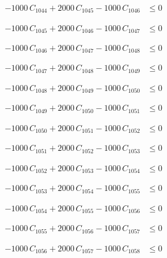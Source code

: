 \documentclass[a4paper,11pt]{article}
\begin{document}
\begin{align}
-1000\,C_{1044} + 2000\,C_{1045} - 1000\,C_{1046} &\leq 0 \nonumber
\end{align}

\begin{align}
-1000\,C_{1045} + 2000\,C_{1046} - 1000\,C_{1047} &\leq 0 \nonumber
\end{align}

\begin{align}
-1000\,C_{1046} + 2000\,C_{1047} - 1000\,C_{1048} &\leq 0 \nonumber
\end{align}

\begin{align}
-1000\,C_{1047} + 2000\,C_{1048} - 1000\,C_{1049} &\leq 0 \nonumber
\end{align}

\begin{align}
-1000\,C_{1048} + 2000\,C_{1049} - 1000\,C_{1050} &\leq 0 \nonumber
\end{align}

\begin{align}
-1000\,C_{1049} + 2000\,C_{1050} - 1000\,C_{1051} &\leq 0 \nonumber
\end{align}

\begin{align}
-1000\,C_{1050} + 2000\,C_{1051} - 1000\,C_{1052} &\leq 0 \nonumber
\end{align}

\begin{align}
-1000\,C_{1051} + 2000\,C_{1052} - 1000\,C_{1053} &\leq 0 \nonumber
\end{align}

\begin{align}
-1000\,C_{1052} + 2000\,C_{1053} - 1000\,C_{1054} &\leq 0 \nonumber
\end{align}

\begin{align}
-1000\,C_{1053} + 2000\,C_{1054} - 1000\,C_{1055} &\leq 0 \nonumber
\end{align}

\begin{align}
-1000\,C_{1054} + 2000\,C_{1055} - 1000\,C_{1056} &\leq 0 \nonumber
\end{align}

\begin{align}
-1000\,C_{1055} + 2000\,C_{1056} - 1000\,C_{1057} &\leq 0 \nonumber
\end{align}

\begin{align}
-1000\,C_{1056} + 2000\,C_{1057} - 1000\,C_{1058} &\leq 0 \nonumber
\end{align}
\end{document}
